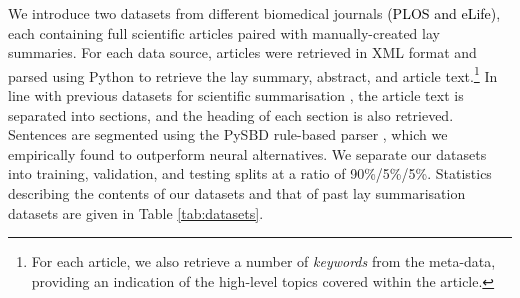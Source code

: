 \documentclass[11pt]{article}
\begin{document}
We introduce two datasets from different biomedical journals \textcolor{black}{(PLOS and eLife)}, each containing full scientific articles paired with manually-created lay summaries. For each data source, articles were retrieved in XML format and parsed using Python to retrieve the lay summary, abstract, and article text.\footnote{For each article, we also retrieve a number of \textit{keywords} from the meta-data, providing an indication of the high-level topics covered within the article.}  
In line with previous datasets for scientific summarisation \citep{Cohan2018-nq}, the article text is separated into sections, and the heading of each section is also retrieved. Sentences are segmented using the PySBD rule-based parser \citep{sadvilkar-neumann-2020-pysbd}, which we empirically found to outperform neural alternatives. 
We separate our datasets into training, validation, and testing splits at a ratio of 90\%/5\%/5\%. Statistics describing the contents of our datasets and that of past lay summarisation datasets are given in Table \ref{tab:datasets}. 


\begin{table}[t]
    \centering
    \caption{Statistics of lay summarisation datasets, with ours given in \textbf{bold}. Words and sentences (sents) are average values.} 
    \label{tab:datasets}
\end{table}
\end{document}
